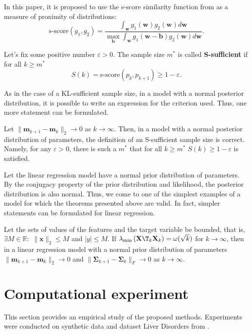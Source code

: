 \documentclass[runningheads]{llncs}
\begin{document}
In this paper, it is proposed to use the s-score similarity function from \cite{Aduenko2017} as a measure of proximity of distributions:
\[\text{s-score}(g_1, g_2) = \dfrac{\int_{\mathbf{w}} g_1(\mathbf{w}) g_2(\mathbf{w}) d\mathbf{w}}{\max_{\mathbf{b}} \int_{\mathbf{w}} g_1(\mathbf{w} - \mathbf{b}) g_2(\mathbf{w}) d\mathbf{w}}. \]

\begin{definition}
    Let's fix some positive number $\varepsilon > 0$. The sample size $m^*$ is called \textbf{S-sufficient} if for all $k\geqslant m^*$
    \[ S(k) = \text{s-score}(p_k, p_{k+1}) \geqslant 1-\varepsilon. \]
\end{definition}

As in the case of a KL-sufficient sample size, in a model with a normal posterior distribution, it is possible to write an expression for the criterion used. Thus, one more statement can be formulated.

\begin{theorem}\label{theorem2}
    Let $\|\mathbf{m}_{k+1} - \mathbf{m}_k\|_2\to 0$ as $k \to \infty$. Then, in a model with a normal posterior distribution of parameters, the definition of an S-sufficient sample size is correct. Namely, for any $\varepsilon > 0$, there is such a $m^*$ that for all $k\geqslant m^*$ $S(k)\geqslant 1-\varepsilon$ is satisfied.
\end{theorem}

Let the linear regression model have a normal prior distribution of parameters. By the conjugacy property of the prior distribution and likelihood, the posterior distribution is also normal. Thus, we come to one of the simplest examples of a model for which the theorems presented above are valid. In fact, simpler statements can be formulated for linear regression.

\begin{theorem}\label{theorem3}
    Let the sets of values of the features and the target variable be bounded, that is, $\exists M\in \mathbb{R}:$ $\|\mathbf{x}\|_2\leqslant M$ and $|y|\leqslant M$. If $\lambda_{\min}\left(\mathbf{X}\T_k \mathbf{X}_k \right) = \omega(\sqrt{k})$ for $k\to \infty$, then in a linear regression model with a normal prior distribution of parameters $\|\mathbf{m}_{k+1} - \mathbf{m}_k\|_2\to 0$ and $\|\mathbf{\Sigma}_{k+1} - \mathbf{\Sigma}_k\|_{F}\to 0$ as $k\to \infty$.
\end{theorem}

\section{Computational experiment}
This section provides an empirical study of the proposed methods. Experiments were conducted on synthetic data and dataset Liver Disorders from \cite{UCI}. 
\end{document}

